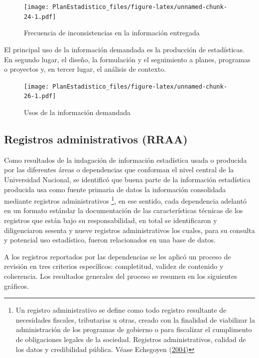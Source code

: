 \documentclass[
]{book}
\begin{document}
\begin{figure}
\centering
\texttt{[image: PlanEstadistico\_files/figure-latex/unnamed-chunk-24-1.pdf]}
\caption{\label{fig:unnamed-chunk-24}Frecuencia de inconsistencias en la información entregada}
\end{figure}

El principal uso de la información demandada es la producción de estadísticas. En segundo lugar, el diseño, la formulación y el seguimiento a planes, programas o proyectos y, en tercer lugar, el análisis de contexto.

\begin{figure}
\centering
\texttt{[image: PlanEstadistico\_files/figure-latex/unnamed-chunk-26-1.pdf]}
\caption{\label{fig:unnamed-chunk-26}Usos de la información demandada}
\end{figure}

\hypertarget{registros-administrativos-rraa}{%
\subsection{Registros administrativos (RRAA)}\label{registros-administrativos-rraa}}

Como resultados de la indagación de información estadística usada o producida por las diferentes
áreas o dependencias que conforman el nivel central de la Universidad Nacional, se identificó que
buena parte de la información estadística producida usa como fuente primaria de datos la
información consolidada mediante registros administrativos \footnote{Un registro administrativo se define como todo registro resultante de necesidades fiscales, tributarias u otras, creado con la finalidad de viabilizar la administración de los programas de gobierno o para fiscalizar el
  cumplimento de obligaciones legales de la sociedad. Registros administrativos, calidad de los datos y
  credibilidad pública. Véase Echegoyen (\protect\hyperlink{ref-echegoyen2004registros}{2004})}, en ese sentido, cada dependencia
adelantó en un formato estándar la documentación de las características técnicas de los registros
que están bajo su responsabilidad, en total se identificaron y diligenciaron sesenta y nueve
registros administrativos los cuales, para su consulta y potencial uso estadístico, fueron
relacionados en una base de datos.

A los registros reportados por las dependencias se les aplicó un proceso de revisión en tres
criterios específicos: completitud, validez de contenido y coherencia. Los resultados generales del
proceso se resumen en los siguientes gráficos.
\end{document}
